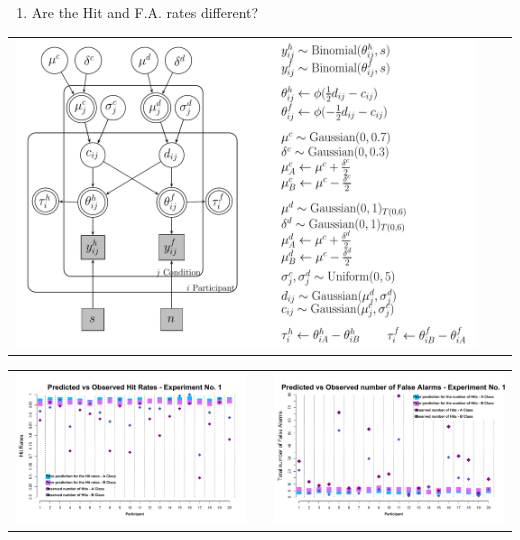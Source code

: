 \documentclass[final]{beamer}
\newlength{\onecolwid}
\newlength{\twocolwid}
\begin{document}
\begin{frame}[t]
\begin{columns}[t]
\begin{column}{\twocolwid}
\begin{columns}[t,totalwidth=\twocolwid]
\begin{column}{\onecolwid}
\begin{alertblock}{}
\begin{enumerate}
\item Are the Hit and F.A. rates different?
\end{enumerate}
\begin{center}
\begin{tabular}{ccc}
\includegraphics[width=0.9\linewidth]{Figures/3_Taus.pdf}
\end{tabular}
\end{center}

\begin{center}
\begin{tabular}{ccc}
\includegraphics[width=0.45\linewidth]{Figures/3-PredictionsH.pdf} & \hfill & \includegraphics[width=0.45\linewidth]{Figures/3-PredictionsF.pdf}
\end{tabular}
\end{center}


\end{alertblock}
\end{column}
\end{columns}
\end{column}
\end{columns}
\end{frame}
\end{document}
